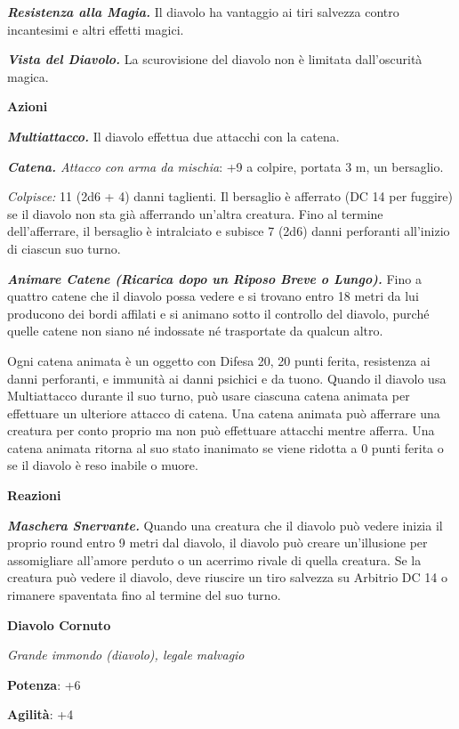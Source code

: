 \begin{multicols}{2}
\emph{\textbf{Resistenza alla Magia.}} Il diavolo ha vantaggio ai tiri
salvezza contro incantesimi e altri effetti magici.

\emph{\textbf{Vista del Diavolo.}} La scurovisione del diavolo non è
limitata dall'oscurità magica.

\smallskip\textbf{Azioni}

\emph{\textbf{Multiattacco.}} Il diavolo effettua due attacchi con la
catena.

\emph{\textbf{Catena.} Attacco con arma da mischia}: +9 a colpire,
portata 3 m, un bersaglio.

\emph{Colpisce:} 11 (2d6 + 4) danni taglienti. Il bersaglio è afferrato
(DC 14 per fuggire) se il diavolo non sta già afferrando un'altra
creatura. Fino al termine dell'afferrare, il bersaglio è intralciato e
subisce 7 (2d6) danni perforanti all'inizio di ciascun suo turno.

\emph{\textbf{Animare Catene (Ricarica dopo un Riposo Breve o Lungo).}}
Fino a quattro catene che il diavolo possa vedere e si trovano entro 18
metri da lui producono dei bordi affilati e si animano sotto il
controllo del diavolo, purché quelle catene non siano né indossate né
trasportate da qualcun altro.

Ogni catena animata è un oggetto con Difesa 20, 20 punti ferita, resistenza
ai danni perforanti, e immunità ai danni psichici e da tuono. Quando il
diavolo usa Multiattacco durante il suo turno, può usare ciascuna catena
animata per effettuare un ulteriore attacco di catena. Una catena
animata può afferrare una creatura per conto proprio ma non può
effettuare attacchi mentre afferra. Una catena animata ritorna al suo
stato inanimato se viene ridotta a 0 punti ferita o se il diavolo è reso
inabile o muore.

\textbf{Reazioni}

\emph{\textbf{Maschera Snervante.}} Quando una creatura che il diavolo
può vedere inizia il proprio round entro 9 metri dal diavolo, il diavolo
può creare un'illusione per assomigliare all'amore perduto o un acerrimo
rivale di quella creatura. Se la creatura può vedere il diavolo, deve
riuscire un tiro salvezza su Arbitrio DC 14 o rimanere spaventata fino
al termine del suo turno.

\textbf{Diavolo Cornuto}

\emph{Grande immondo (diavolo), legale malvagio}

\textbf{Potenza}: +6

\textbf{Agilità}: +4


\end{multicols}
